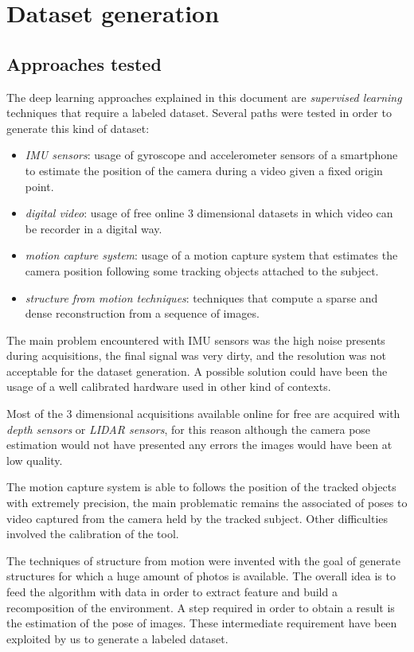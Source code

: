 \section{Dataset generation}
\subsection{Approaches tested}
The deep learning approaches explained in this document are \textit{supervised learning} techniques that require a labeled dataset. Several paths were tested in order to generate this kind of dataset:
\begin{itemize}
    \item \textit{IMU sensors}: usage of gyroscope and accelerometer sensors of a smartphone to estimate the position of the camera during a video given a fixed origin point. 
    \item \textit{digital video}: usage of free online 3 dimensional datasets in which video can be recorder in a digital way.
    \item \textit{motion capture system}: usage of a motion capture system that estimates the camera position following some tracking objects attached to the subject.
    \item \textit{structure from motion techniques}: techniques that compute a sparse and dense reconstruction from a sequence of images.
\end{itemize}

The main problem encountered with IMU sensors was the high noise presents during acquisitions, the final signal was very dirty, and the resolution was not acceptable for the dataset generation. A possible solution could have been the usage of a well calibrated hardware used in other kind of contexts.

Most of the 3 dimensional acquisitions available online for free are acquired with \textit{depth sensors} or \textit{LIDAR sensors}, for this reason although the camera pose estimation would not have presented any errors the images would have been at low quality.

The motion capture system is able to follows the position of the tracked objects with extremely precision, the main problematic remains the associated of poses to video captured from the camera held by the tracked subject. Other difficulties involved the calibration of the tool.

The techniques of structure from motion were invented with the goal of generate structures for which a huge amount of photos is available. The overall idea is to feed the algorithm with data in order to extract feature and build a recomposition of the environment. A step required in order to obtain a result is the estimation of the pose of images. These intermediate requirement have been exploited by us to generate a labeled dataset.

